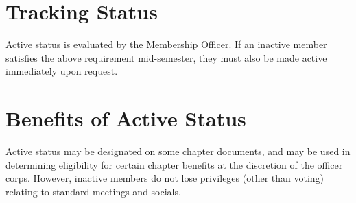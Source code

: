 \section{Tracking Status}
Active status is evaluated by the Membership Officer.
If an inactive member satisfies the above requirement mid-semester, they must also be made active immediately upon request.

\section{Benefits of Active Status}
Active status may be designated on some chapter documents, and may be used in determining eligibility for certain chapter benefits at the discretion of the officer corps.
However, inactive members do not lose privileges (other than voting) relating to standard meetings and socials.